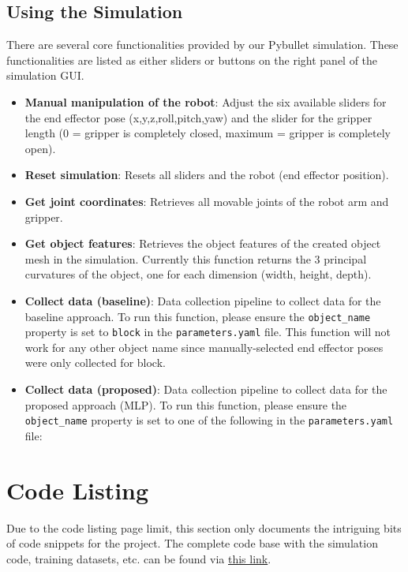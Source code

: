 \documentclass[11pt, a4paper]{report}
\begin{document}
\section{Using the Simulation}\label{apdx:2.3}
There are several core functionalities provided by our Pybullet simulation. These functionalities are listed as either sliders or buttons on the right panel of the simulation GUI.
\begin{itemize}
    \item \textbf{Manual manipulation of the robot}: Adjust the six available sliders for the end effector pose (x,y,z,roll,pitch,yaw) and the slider for the gripper length (0 = gripper is completely closed, maximum = gripper is completely open).
    \item \textbf{Reset simulation}: Resets all sliders and the robot (end effector position).
    \item \textbf{Get joint coordinates}: Retrieves all movable joints of the robot arm and gripper.
    \item \textbf{Get object features}: Retrieves the object features of the created object mesh in the simulation. Currently this function returns the 3 principal curvatures of the object, one for each dimension (width, height, depth).
    \item \textbf{Collect data (baseline)}: Data collection pipeline to collect data for the baseline approach. To run this function, please ensure the \verb|object_name| property is set to \verb|block| in the \verb|parameters.yaml| file. This function will not work for any other object name since manually-selected end effector poses were only collected for block.
    \item \textbf{Collect data (proposed)}: Data collection pipeline to collect data for the proposed approach (MLP). To run this function, please ensure the \verb|object_name| property is set to one of the following in the \verb|parameters.yaml| file:
\end{itemize}


\chapter{Code Listing}\label{apdx:3}
Due to the code listing page limit, this section only documents the intriguing bits of code snippets for the project. The complete code base with the simulation code, training datasets, etc. can be found via \hyperref[]{this link}.
\end{document}
